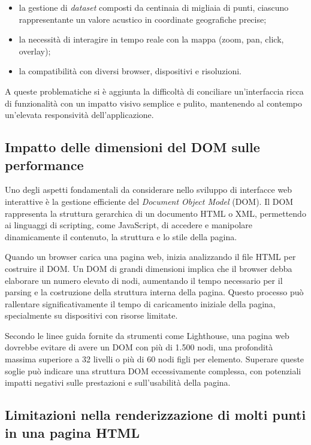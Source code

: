 \begin{itemize}
  \item la gestione di \textit{dataset} composti da centinaia di migliaia di punti, ciascuno rappresentante un valore acustico in coordinate geografiche precise;
  \item la necessità di interagire in tempo reale con la mappa (zoom, pan, click, overlay);
  \item la compatibilità con diversi browser, dispositivi e risoluzioni.
\end{itemize}

A queste problematiche si è aggiunta la difficoltà di conciliare un'interfaccia ricca di funzionalità con un impatto visivo semplice e pulito, mantenendo al contempo un'elevata responsività dell'applicazione.

\subsection{Impatto delle dimensioni del DOM sulle performance}

Uno degli aspetti fondamentali da considerare nello sviluppo di interfacce web interattive è la gestione efficiente del \textit{Document Object Model} (DOM). Il DOM rappresenta la struttura gerarchica di un documento HTML o XML, permettendo ai linguaggi di scripting, come JavaScript, di accedere e manipolare dinamicamente il contenuto, la struttura e lo stile della pagina.

Quando un browser carica una pagina web, inizia analizzando il file HTML per costruire il DOM. Un DOM di grandi dimensioni implica che il browser debba elaborare un numero elevato di nodi, aumentando il tempo necessario per il parsing e la costruzione della struttura interna della pagina. Questo processo può rallentare significativamente il tempo di caricamento iniziale della pagina, specialmente su dispositivi con risorse limitate.

Secondo le linee guida fornite da strumenti come Lighthouse, una pagina web dovrebbe evitare di avere un DOM con più di 1.500 nodi, una profondità massima superiore a 32 livelli o più di 60 nodi figli per elemento. Superare queste soglie può indicare una struttura DOM eccessivamente complessa, con potenziali impatti negativi sulle prestazioni e sull'usabilità della pagina. \cite{chrome-dom-size}

\subsection{Limitazioni nella renderizzazione di molti punti in una pagina HTML}

